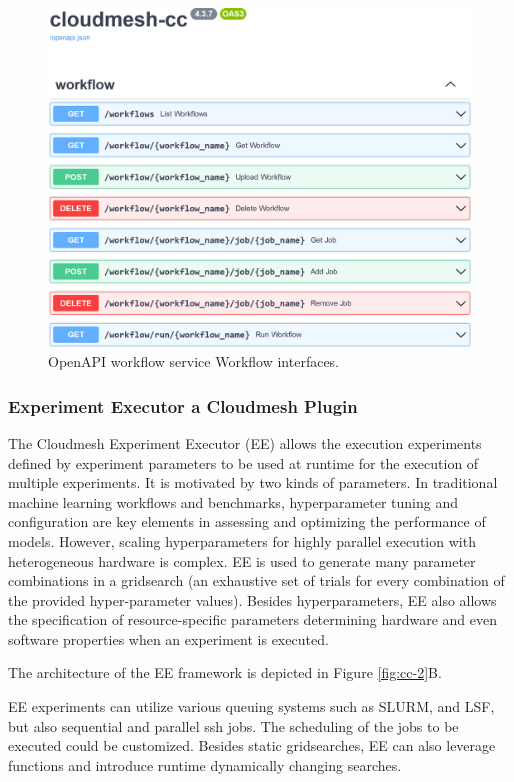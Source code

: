 \documentclass[utf8]{FrontiersinVancouver} %
\begin{document}
\begin{figure}[htb]
    \centering\includegraphics[width=0.49\columnwidth]{images/fastapi-service-highres.jpg}
      
    \caption{OpenAPI workflow service Workflow interfaces.}
    \label{fig:cc-3}
\end{figure}





\subsubsection{Experiment Executor a Cloudmesh Plugin}

\label{sec:workflow-ee}

The Cloudmesh Experiment Executor (EE) \citep{las-frontiers-edu} allows the execution experiments defined by experiment parameters to be used at runtime for the execution of multiple experiments. It is motivated by two kinds of parameters. 
In traditional machine learning workflows and benchmarks, hyperparameter tuning and configuration are key elements in assessing and optimizing the performance of models. However, scaling hyperparameters for highly parallel execution with heterogeneous hardware is complex. EE is used to generate many parameter combinations in a gridsearch (an exhaustive set of trials for every combination of the provided hyper-parameter values). Besides hyperparameters, EE also allows the specification of resource-specific parameters determining hardware and even software properties when an experiment is executed.

The architecture of the EE framework is depicted in Figure \ref{fig:cc-2}B.

EE experiments can utilize various queuing systems such as SLURM, and LSF, but also sequential and parallel ssh jobs. The scheduling of the jobs to be executed could be customized. Besides static gridsearches, EE can also leverage functions and introduce runtime dynamically changing searches.
\end{document}
